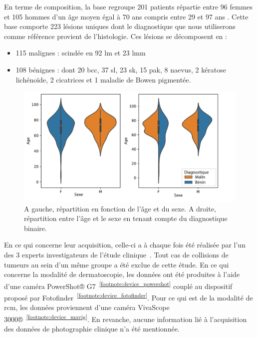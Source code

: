 En terme de composition, la base regroupe 201 patients répartie entre 96 femmes et 105 hommes d'un âge moyen égal à 70 ans compris entre 29 et 97 ans . Cette base comporte 223 lésions uniques dont le diagnostique que nous utiliserons comme référence provient de l'histologie. Ces lésions se décomposent en :
\begin{itemize}
\item 115 malignes : scindée en 92 \gls{lm} et 23 \gls{lmm}
\item 108 bénignes : dont 20 \gls{bcc}, 37 \gls{sl}, 23 \gls{sk}, 15 \gls{pak}, 8 naevus, 2 kératose lichénoïde, 2 cicatrices et 1 maladie de Bowen pigmentée.
\end{itemize}\par

\begin{figure}[H]
    \centering
    \includegraphics[width=0.8\linewidth]{contents/chapter_2/resources/statistics.pdf}
    \caption{A gauche, répartition en fonction de l'âge et du sexe. A droite, répartition entre l'âge et le sexe en tenant compte du diagnostique binaire.}
    \label{fig:statistics}
\end{figure}\par

En ce qui concerne leur acquisition, celle-ci a à chaque fois été réalisée par l'un des 3 experts investigateurs de l'étude clinique~\cite{Cinotti2018}. Tout cas de collisions de tumeurs au sein d'un même groupe a été exclue de cette étude. En ce qui concerne la modalité de dermatoscopie, les données ont été produites à l'aide d'une caméra PowerShot® G7~\textsuperscript{\ref{footnote:device_powershot}} couplé au dispositif proposé par Fotofinder~\textsuperscript{\ref{footnote:device_fotofinder}}. Pour ce qui est de la modalité de \gls{rcm}, les données proviennent d'une caméra VivaScope 3000®~\textsuperscript{\ref{footnote:device_mavig}}. En revanche, aucune information lié à l'acquisition des données de photographie clinique n'a été mentionnée.\par

